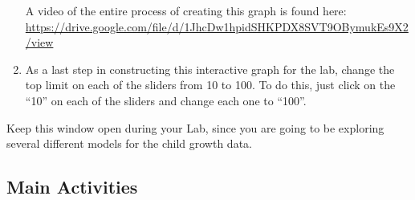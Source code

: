 \documentclass[11pt,letterpaper]{article}
\begin{document}
\begin{enumerate}
\begin{center}
	\end{center}
	A video of the entire process of creating this graph is found here: \url{https://drive.google.com/file/d/1JhcDw1hpidSHKPDX8SVT9OBymukEs9X2/view}
	\item As a last step in constructing this interactive graph for the lab, change the top limit on each of the sliders from 10 to 100. To do this, just click on the ``10'' on each of the sliders and change each one to ``100''. 
\end{enumerate}

Keep this window open during your Lab, since you are going to be exploring several different models for the child growth data. 


\subsection*{Main Activities}
\end{document}
